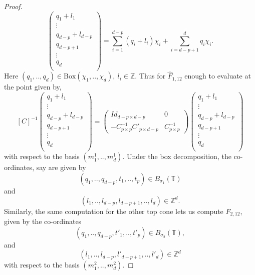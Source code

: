 \documentclass[10pt]{amsart}
\numberwithin{equation}{subsection}
\begin{document}
\begin{proof}
$$\begin{pmatrix}
  q_1+l_1 \\
  \vdots \\
  q_{d-p}+l_{d-p} \\
  q_{d-p+1} \\
  \vdots \\
  q_{d} \\
\end{pmatrix}=\sum_{i=1}^{d-p}(q_i+l_i)\chi_i+\sum_{i=d-p+1}^{d}q_i\chi_i.$$ Here $(q_1,..,q_d)\in \text{Box}(\chi_1,..,\chi_d),\ l_i\in \mathbb{Z}.$\newline
Thus for $\hat{F}_{1,12}$ enough to evaluate at the point given by,
$$[C]^{-1}\begin{pmatrix}
  q_1+l_1 \\
  \vdots \\
  q_{d-p}+l_{d-p} \\
  q_{d-p+1} \\
  \vdots \\
  q_{d} \\
\end{pmatrix}=\left(\begin{array}{cc} Id_{d-p \times d-p} & 0\\ -C^{-1}_{p\times p}C'_{p\times d-p} & C^{-1}_{p\times p} \end{array}\right)\begin{pmatrix}
  q_1+l_1 \\
  \vdots \\
  q_{d-p}+l_{d-p} \\
  q_{d-p+1} \\
  \vdots \\
  q_{d} \\
\end{pmatrix}$$ with respect to the basis $(m^1_1,..,m^1_d).$ \newline 
Under the box decomposition, the co-ordinates, say are given by $$(q_1,..,q_{d-p},t_{1},..,t_p)\in B_{\sigma_1}(\mathbb{T})$$ and $$(l_1,..,l_{d-p},l_{d-p+1},..,l_d)\in \mathbb{Z}^d.$$
Similarly, the same computation for the other top cone lets us compute $\hat{F}_{2,12}$, given by the co-ordinates
$$(q_1,..,q_{d-p},t'_1,..,t'_p)\in B_{\sigma_2}(\mathbb{T}),$$ and $$(l_1,..,l_{d-p},l'_{d-p+1},..,l'_{d})\in \mathbb{Z}^d$$ with respect to the basis $(m^2_1,..,m^2_d).$\par 

\end{proof}
\end{document}
